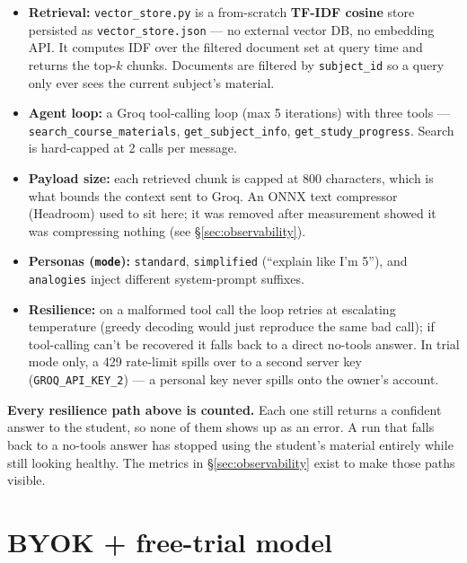 \documentclass[11pt,a4paper]{article}
\newcommand{\code}[1]{\colorbox{fbCream}{\texttt{\small #1}}}
\begin{document}
\begin{itemize}[leftmargin=1.4em]
\item \textbf{Retrieval:} \code{vector\_store.py} is a from-scratch
  \textbf{TF-IDF cosine} store persisted as \code{vector\_store.json} --- no
  external vector DB, no embedding API. It computes IDF over the filtered document
  set at query time and returns the top-$k$ chunks. Documents are filtered by
  \code{subject\_id} so a query only ever sees the current subject's material.
\item \textbf{Agent loop:} a Groq tool-calling loop (max 5 iterations) with three
  tools --- \code{search\_course\_materials}, \code{get\_subject\_info},
  \code{get\_study\_progress}. Search is hard-capped at 2 calls per message.
\item \textbf{Payload size:} each retrieved chunk is capped at 800 characters,
  which is what bounds the context sent to Groq. An ONNX text compressor
  (Headroom) used to sit here; it was removed after measurement showed it was
  compressing nothing (see \S\ref{sec:observability}).
\item \textbf{Personas (\code{mode}):} \code{standard}, \code{simplified}
  (``explain like I'm 5''), and \code{analogies} inject different system-prompt
  suffixes.
\item \textbf{Resilience:} on a malformed tool call the loop retries at escalating
  temperature (greedy decoding would just reproduce the same bad call); if
  tool-calling can't be recovered it falls back to a direct no-tools answer. In
  trial mode only, a 429 rate-limit spills over to a second server key
  (\code{GROQ\_API\_KEY\_2}) --- a personal key never spills onto the owner's
  account.
\end{itemize}

\begin{tcolorbox}[colback=fbCream,colframe=fbSage,boxrule=1pt,arc=2pt,left=8pt,right=8pt,top=6pt,bottom=6pt]
\textbf{Every resilience path above is counted.} Each one still returns a
confident answer to the student, so none of them shows up as an error. A run that
falls back to a no-tools answer has stopped using the student's material
entirely while still looking healthy. The metrics in
\S\ref{sec:observability} exist to make those paths visible.
\end{tcolorbox}

\section{BYOK + free-trial model}\label{sec:byok}
\end{document}
